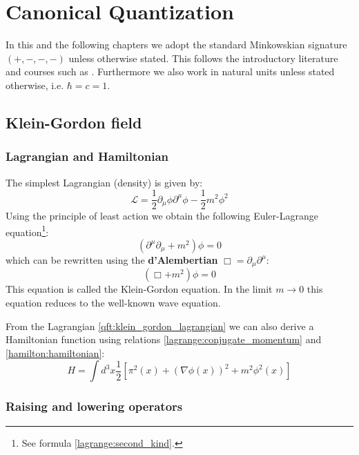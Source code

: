 \chapter{Canonical Quantization}

	In this and the following chapters we adopt the standard Minkowskian signature $(+, -, -, -)$ unless otherwise stated. This follows the introductory literature and courses such as \cite{Peskin, greiner_qft}. Furthermore we also work in natural units unless stated otherwise, i.e. $\hbar = c = 1$.

\section{Klein-Gordon field}
\subsection{Lagrangian and Hamiltonian}

	The simplest Lagrangian (density) is given by:
	\begin{equation}
		\label{qft:klein_gordon_lagrangian}
		\boxed{\mathcal{L} = \frac{1}{2}\partial_\mu\phi\partial^\mu\phi - \frac{1}{2}m^2\phi^2}
	\end{equation}
	Using the principle of least action we obtain the following Euler-Lagrange equation\footnote{See formula \ref{lagrange:second_kind}.}:
	\begin{equation}
		\left(\partial^\mu\partial_\mu + m^2\right)\phi = 0
	\end{equation}
	which can be rewritten using the \textbf{d'Alembertian} $\Box = \partial_\mu\partial^\mu$:
	\begin{equation}
		\label{qft:klein_gordon_equation}
		\boxed{(\Box+m^2)\phi = 0}
	\end{equation}
	This equation is called the Klein-Gordon equation. In the limit $m\rightarrow0$ this equation reduces to the well-known wave equation.
	
	From the Lagrangian \ref{qft:klein_gordon_lagrangian} we can also derive a Hamiltonian function using relations \ref{lagrange:conjugate_momentum} and \ref{hamilton:hamiltonian}:
	\begin{equation}
		\label{qft:klein_gordon_hamiltonian}
		\boxed{H = \int d^3x \frac{1}{2}\left[\pi^2(x) + (\nabla\phi(x))^2 + m^2\phi^2(x)\right]}
	\end{equation}
	
	
\subsection{Raising and lowering operators}

